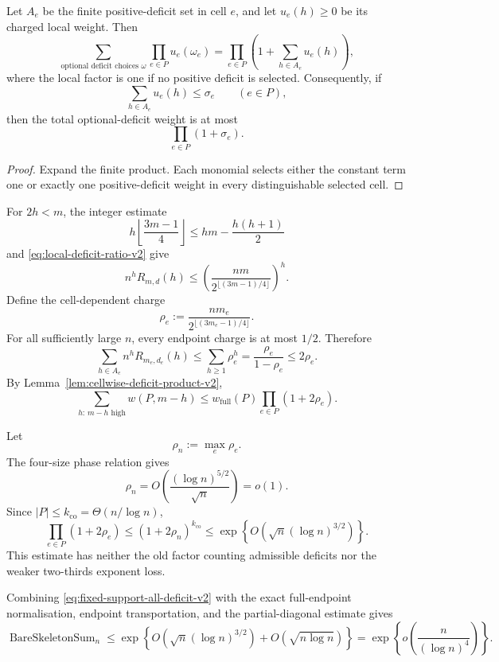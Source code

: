 \begin{lemma}
\label{lem:cellwise-deficit-product-v2}
Let $A_e$ be the finite positive-deficit set in cell $e$, and let
$u_e(h)\ge0$ be its charged local weight.  Then
\[
  \sum_{\text{optional deficit choices }\omega}
    \prod_{e\in P}u_e(\omega_e)
  =
  \prod_{e\in P}
    \left(1+\sum_{h\in A_e}u_e(h)\right),
\]
where the local factor is one if no positive deficit is selected.
Consequently, if
\[
  \sum_{h\in A_e}u_e(h)\le \sigma_e
  \qquad(e\in P),
\]
then the total optional-deficit weight is at most
\[
  \prod_{e\in P}(1+\sigma_e).
\]
\end{lemma}

\begin{proof}
Expand the finite product.  Each monomial selects either the constant term one
or exactly one positive-deficit weight in every distinguishable selected cell.
\end{proof}

For $2h<m$, the integer estimate
\[
  h\left\lfloor\frac{3m-1}{4}\right\rfloor
  \le
  hm-\frac{h(h+1)}2
\]
and \eqref{eq:local-deficit-ratio-v2} give
\begin{equation}
  n^hR_{m,d}(h)
  \le
  \left(
    \frac{nm}{2^{\lfloor(3m-1)/4\rfloor}}
  \right)^h.
  \label{eq:three-quarter-local-charge-v2}
\end{equation}
Define the cell-dependent charge
\[
  \rho_e
  :=
  \frac{n m_e}{2^{\lfloor(3m_e-1)/4\rfloor}}.
\]
For all sufficiently large $n$, every endpoint charge is at most $1/2$.
Therefore
\[
  \sum_{h\in A_e}n^hR_{m_e,d_e}(h)
  \le
  \sum_{h\ge1}\rho_e^h
  =
  \frac{\rho_e}{1-\rho_e}
  \le2\rho_e.
\]
By Lemma~\ref{lem:cellwise-deficit-product-v2},
\begin{equation}
  \sum_{h:\,m-h\text{ high}}w(P,m-h)
  \le
  w_{\mathrm{full}}(P)
  \prod_{e\in P}(1+2\rho_e).
  \label{eq:fixed-support-all-deficit-v2}
\end{equation}

Let
\[
  \rho_n:=\max_e\rho_e.
\]
The four-size phase relation gives
\[
  \rho_n
  =
  O\!\left(
    \frac{(\log n)^{5/2}}{\sqrt n}
  \right)
  =o(1).
\]
Since $|P|\le k_{\mathrm{co}}=\Theta(n/\log n)$,
\[
  \prod_{e\in P}(1+2\rho_e)
  \le
  (1+2\rho_n)^{k_{\mathrm{co}}}
  \le
  \exp\!\left\{
    O\!\left(\sqrt n(\log n)^{3/2}\right)
  \right\}.
\]
This estimate has neither the old factor counting admissible deficits nor the
weaker two-thirds exponent loss.

Combining \eqref{eq:fixed-support-all-deficit-v2} with the exact full-endpoint
normalisation, endpoint transportation, and the partial-diagonal estimate gives
\begin{equation}
  \operatorname{BareSkeletonSum}_n
  \le
  \exp\!\left\{
    O\!\left(\sqrt n(\log n)^{3/2}\right)
    +O(\sqrt{n\log n})
  \right\}
  =
  \exp\!\left\{
    o\!\left(\frac{n}{(\log n)^4}\right)
  \right\}.
  \label{eq:bare-skeleton-sharp-v2}
\end{equation}

